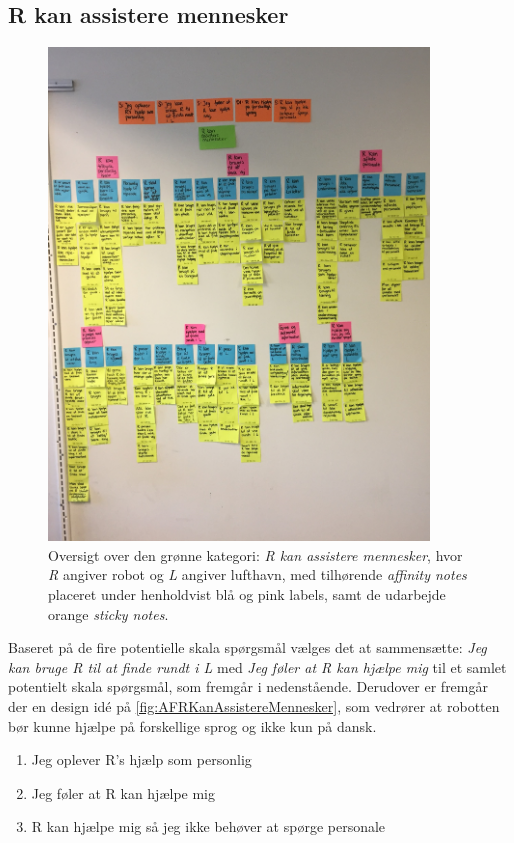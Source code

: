 \subsection{R kan assistere mennesker}
\label{ParametreRKanAssistereMennesker}
%
\begin{figure}[H]
\centering
\includegraphics[width = 0.9\textwidth]{Figure/AffinityDiagram/RKanAssistereMennesker} 
\caption{Oversigt over den grønne kategori: \textit{R kan assistere mennesker}, hvor \textit{R} angiver robot og \textit{L} angiver lufthavn, med tilhørende \textit{affinity notes} placeret under henholdvist blå og pink labels, samt de udarbejde orange \textit{sticky notes}.}
\label{fig:AFRKanAssistereMennesker}
\end{figure}
\noindent
%
Baseret på de fire potentielle skala spørgsmål vælges det at sammensætte: \textit{Jeg kan bruge R til at finde rundt i L} med \textit{Jeg føler at R kan hjælpe mig} til et samlet potentielt skala spørgsmål, som fremgår i nedenstående. Derudover er fremgår der en design idé på \autoref{fig:AFRKanAssistereMennesker}, som vedrører at robotten bør kunne hjælpe på forskellige sprog og ikke kun på dansk.\blankline 
%
\begin{enumerate}
  \item Jeg oplever R's hjælp som personlig
  \item Jeg føler at R kan hjælpe mig
  \item R kan hjælpe mig så jeg ikke behøver at spørge personale\blankline
\end{enumerate}
